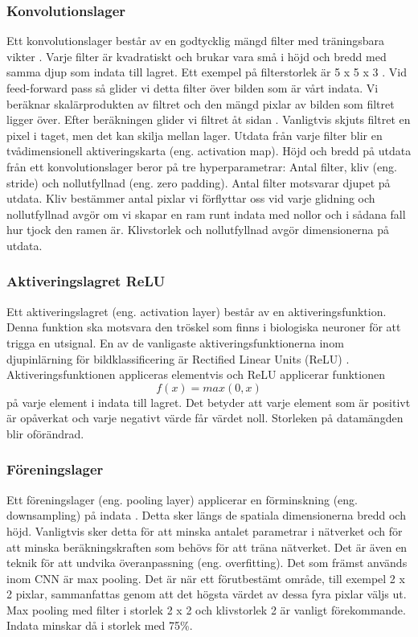 \documentclass[]{kththesis}
\begin{document}
\subsubsection{Konvolutionslager}
Ett konvolutionslager består av en godtycklig mängd filter med träningsbara vikter \parencite{lecun1995convolutional}. Varje filter är kvadratiskt och brukar vara små i höjd och bredd med samma djup som indata till lagret. Ett exempel på filterstorlek är 5 x 5 x 3 \parencite{krizhevsky2012imagenet}. Vid feed-forward pass så glider vi detta filter över bilden som är vårt indata. Vi beräknar skalärprodukten av filtret och den mängd pixlar av bilden som filtret ligger över. Efter beräkningen glider vi filtret åt sidan \parencite{he2015spatial}. Vanligtvis skjuts filtret en pixel i taget, men det kan skilja mellan lager. Utdata från varje filter blir en tvådimensionell aktiveringskarta (eng. activation map). Höjd och bredd på utdata från ett konvolutionslager beror på tre hyperparametrar: Antal filter, kliv (eng. stride) och nollutfyllnad (eng. zero padding). Antal filter motsvarar djupet på utdata. Kliv bestämmer antal pixlar vi förflyttar oss vid varje glidning och nollutfyllnad avgör om vi skapar en ram runt indata med nollor och i sådana fall hur tjock den ramen är. Klivstorlek och nollutfyllnad avgör dimensionerna på utdata.

\subsubsection{Aktiveringslagret ReLU}
Ett aktiveringslagret (eng. activation layer) består av en aktiverings\-funk\-tion. Den\-na funktion ska motsvara den tröskel som finns i biologiska neuroner för att trigga en utsignal. En av de vanligaste aktiveringsfunktionerna inom djupinlärning för bildklassificering är Rectified Linear Units (ReLU) \parencite{krizhevsky2012imagenet}. Aktiveringsfunktionen appliceras elementvis och ReLU applicerar funktionen \begin{equation} f(x) = max(0,x) \end{equation} på varje element i indata till lagret. Det betyder att varje element som är positivt är opåverkat och varje negativt värde får värdet noll. Storleken på datamängden blir oförändrad.

\subsubsection{Föreningslager}
Ett föreningslager (eng. pooling layer) applicerar en förminskning (eng. downsampling) på indata \parencite{krizhevsky2012imagenet}. Detta sker längs de spatiala dimensionerna bredd och höjd. Vanligtvis sker detta för att minska antalet parametrar i nätverket och för att minska beräkningskraften som behövs för att träna nätverket. Det är även en teknik för att undvika överanpassning (eng. overfitting). Det som främst används inom CNN är max pooling. Det är när ett förutbestämt område, till exempel 2 x 2 pixlar, sammanfattas genom att det högsta värdet av dessa fyra pixlar väljs ut. Max pooling med filter i storlek 2 x 2 och klivstorlek 2 är vanligt förekommande. Indata minskar då i storlek med 75\%.
\end{document}
